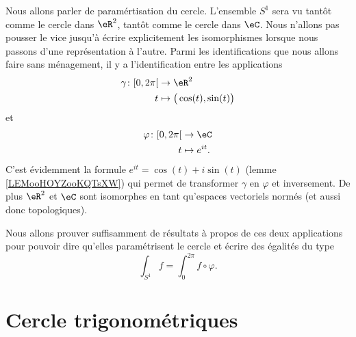 Nous allons parler de paramértisation du cercle. L'ensemble \( S^1\) sera vu tantôt comme le cercle dans \( \eR^2\), tantôt comme le cercle dans \( \eC\). Nous n'allons pas pousser le vice jusqu'à écrire explicitement les isomorphismes lorsque nous passons d'une représentation à l'autre. Parmi les identifications que nous allons faire sans ménagement, il y a l'identification entre les applications
\begin{equation}
	\begin{aligned}
		\gamma\colon \mathopen[ 0 , 2\pi \mathclose[ & \to \eR^2                           \\
		t                                            & \mapsto \big( \cos(t),\sin(t) \big)
	\end{aligned}
\end{equation}
et
\begin{equation}
	\begin{aligned}
		\varphi\colon \mathopen[ 0 , 2\pi \mathclose[ & \to \eC          \\
		t                                             & \mapsto  e^{it}.
	\end{aligned}
\end{equation}
C'est évidemment la formule \(  e^{it}=\cos(t)+i\sin(t)\) (lemme \ref{LEMooHOYZooKQTsXW}) qui permet de transformer \( \gamma\) en \( \varphi\) et inversement. De plus \( \eR^2\) et \( \eC\) sont isomorphes en tant qu'espaces vectoriels normés (et aussi donc topologiques).


Nous allons prouver suffisamment de résultats à propos de ces deux applications pour pouvoir dire qu'elles paramétrisent le cercle et écrire des égalités du type
\begin{equation}
	\int_{S^1}f=\int_{0}^{2\pi}f\circ\varphi.
\end{equation}



\section{Cercle trigonométriques}

